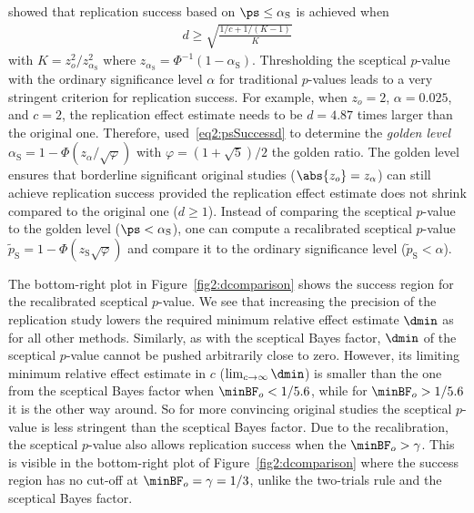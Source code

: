 \citet{Held2021} showed that replication success based on
$\ps \leq \alpha_{\mathrm{S}}$ is achieved when
\begin{align}
  \label{eq2:psSuccessd}
  d \geq \sqrt{\frac{1/c + 1/(K - 1)}{K}}
\end{align}
with $K = z_{o}^{2}/z_{\alpha_{\mathrm{S}}}^{2}$ where
$z_{\alpha_{\mathrm{S}}} = \Phi^{-1}(1 - \alpha_{\mathrm{S}})$. Thresholding the
sceptical $p$-value with the ordinary significance level $\alpha$ for
traditional $p$-values leads to a very stringent criterion for replication
success. For example, when $z_{o} = 2$, $\alpha = 0.025$, and
$c = 2$, the replication effect estimate needs to be
$d = 4.87$ times larger than the original one. Therefore,
\citet{Held2021} used~\eqref{eq2:psSuccessd} to determine the \emph{golden level}
$\alpha_{\mathrm{S}} = 1 - \Phi(z_\alpha/\sqrt{\varphi})$ with
$\varphi = (1 + \sqrt{5})/2$ the golden ratio. The golden level ensures that
borderline significant original studies ($\abs{z_{o}} = z_{\alpha}$) can still
achieve replication success provided the replication effect estimate does not
shrink compared to the original one ($d \geq 1$). Instead of comparing the
sceptical $p$-value to the golden level ($\ps < \alpha_{\mathrm{S}}$), one can
compute a recalibrated sceptical $p$-value
$\tilde{p}_{\mathrm{S}} = 1 - \Phi(z_{\mathrm{S}} \sqrt{\varphi})$ and compare it to
the ordinary significance level ($\tilde{p}_{\mathrm{S}} < \alpha$).

The bottom-right plot in Figure~\ref{fig2:dcomparison} shows the success region
for the recalibrated sceptical $p$-value. We see that increasing the precision
of the replication study lowers the required minimum relative effect estimate
$\dmin$ as for all other methods. Similarly, as with the sceptical Bayes factor,
$\dmin$ of the sceptical $p$-value cannot be pushed arbitrarily close to zero.
However, its limiting minimum relative effect estimate in $c$
($\lim_{c \to \infty}\dmin$) is smaller than the one from the sceptical Bayes
factor when $\minBF_{o} < 1/5.6$, while for
$\minBF_{o} > 1/5.6$ it is the other way around. So for more
convincing original studies the sceptical $p$-value is less stringent than the
sceptical Bayes factor. Due to the recalibration, the sceptical $p$-value also
allows replication success when the $\minBF_{o} > \gamma$. This is visible in
the bottom-right plot of Figure~\ref{fig2:dcomparison} where the success region
has no cut-off at $\minBF_{o} = \gamma = 1/3$, unlike the two-trials rule and
the sceptical Bayes factor.

